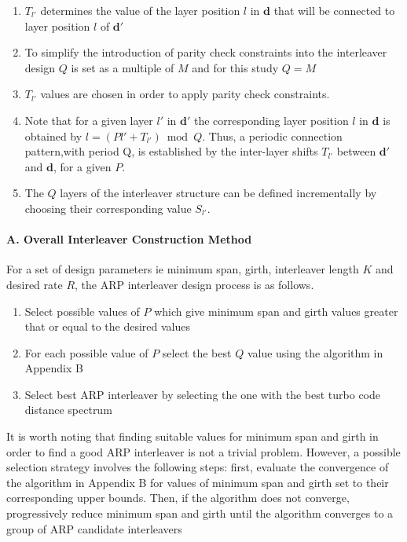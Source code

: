 \documentclass[fontsize=12pt]{article}
\begin{document}
\begin{enumerate}
\item $T_{l'}$ determines the value of the layer position $l$ in $\mathbf{d}$ that will be connected to layer position $l$ of $\mathbf{d}'$

\item To simplify the introduction of parity check constraints into the interleaver design $Q$ is set as a multiple of $M$ and for this study $Q=M$

\item $T_{l'}$ values are chosen in order to apply parity check constraints.

\item Note that for a given layer $l'$ in $\mathbf{d}'$ the corresponding layer position $l$ in $\mathbf{d}$ is obtained by $l = (Pl'+T_{l'} ) \bmod Q$. Thus, a periodic connection pattern,with period Q, is established by the inter-layer shifts $T_{l'}$ between $\mathbf{d}'$ and $\mathbf{d}$, for a given $P$.

\item The $Q$ layers of the interleaver structure can be defined
incrementally by choosing their corresponding value $S_{l'}$.


\end{enumerate}
\paragraph{A. Overall Interleaver Construction Method\newline}
For a set of design parameters ie minimum span, girth, interleaver length $K$ and desired rate $R$, the ARP interleaver design process is as follows.
\begin{enumerate}
\item Select possible values of $P$ which give minimum span and girth values greater that or equal to the desired values

\item For each possible value of $P$ select the best $Q$ value using the algorithm in Appendix B

\item Select best ARP interleaver by selecting the one with the best turbo code distance spectrum
\end{enumerate}
It is worth noting that finding suitable values for minimum span and girth in order to find a good ARP interleaver is not a trivial problem. However,
a possible selection strategy involves the following steps:
first, evaluate the convergence of the algorithm in Appendix
B for values of minimum span and girth set to their corresponding upper
bounds. Then, if the algorithm
does not converge, progressively reduce minimum span and girth until the
algorithm converges to a group of ARP candidate interleavers
\end{document}

